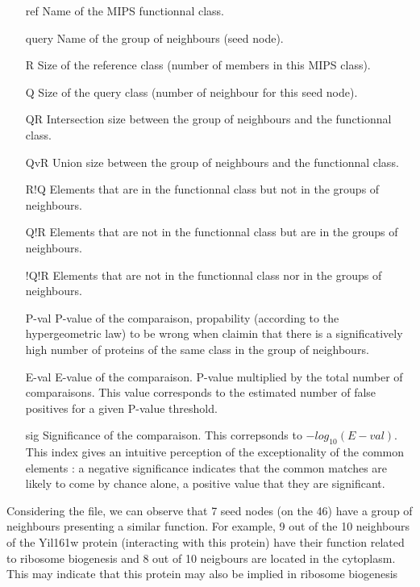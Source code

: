 \begin{itemize}
 \item [ref] Name of the MIPS functionnal class.
 \item [query] Name of the group of neighbours (seed node).
 \item [R] Size of the reference class (number of members in this MIPS class).
 \item [Q] Size of the query class (number of neighbour for this seed node).
 \item [QR] Intersection size between the group of neighbours and the functionnal class.
 \item [QvR] Union size between the group of neighbours and the functionnal class.
 \item [R!Q] Elements that are in the functionnal class but not in the groups of neighbours.
 \item [Q!R] Elements that are not in the functionnal class but are in the groups of neighbours.
 \item [!Q!R] Elements that are not in the functionnal class nor in the groups of neighbours.
 \item [P-val] P-value of the comparaison, propability (according to
   the hypergeometric law) to be wrong when claimin that there is a
   significatively high number of proteins of the same class in the
   group of neighbours.
 \item [E-val] E-value of the comparaison. P-value multiplied by the
   total number of comparaisons. This value corresponds to the
   estimated number of false positives for a given P-value threshold.
 \item [sig] Significance of the comparaison. This correpsonds to
   $-log_{10}(E-val)$. This index gives an intuitive perception of the
   exceptionality of the common elements : a negative significance
   indicates that the common matches are likely to come by chance
   alone, a positive value that they are significant.
\end{itemize}

Considering the file, we can observe that 7 seed nodes (on the 46)
have a group of neighbours presenting a similar function.  For
example, 9 out of the 10 neighbours of the Yil161w protein
(interacting with this protein) have their function related to
ribosome biogenesis and 8 out of 10 neigbours are located in the
cytoplasm. This may indicate that this protein may also be implied in
ribosome biogenesis



